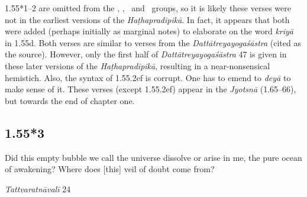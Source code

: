 \begin{ekdosis}

\begin{philcomm}[hp01_055_1]
1.55*1–2 are omitted from the \textalpha, \textgamma, \textdelta\ and \textepsilon\ groups, so it is likely these verses were not in the earliest versions of the \emph{Haṭhapradīpikā}. In fact, it appears that both were added (perhaps initially as marginal notes) to elaborate on the word \emph{kriyā} in 1.55d. Both verses are similar to verses from the \emph{Dattātreyayogaśāstra} (cited as the source). However, only the first half of \emph{Dattātreyayogaśāstra} 47 is given in these later versions of the \emph{Haṭhapradīpikā}, resulting in a near-nonsensical hemistich. Also, the syntax of 1.55.2ef is corrupt. One has to emend to \emph{deyā} to make sense of it. These verses (except 1.55.2ef) appear in the \emph{Jyotsnā} (1.65–66), but towards the end of chapter one. 
\end{philcomm}




\subsection*{1.55*3}
\begin{translation}[hp01_055_3]
Did this empty bubble we call the universe dissolve or arise in me, the pure ocean of awakening? Where does [this] veil of doubt come from?
\end{translation}

\begin{sources}[hp01_055_3]
\emph{Tattvaratnāvalī} 24

\begin{versinnote}
\end{versinnote}


\end{sources}
\end{ekdosis}

